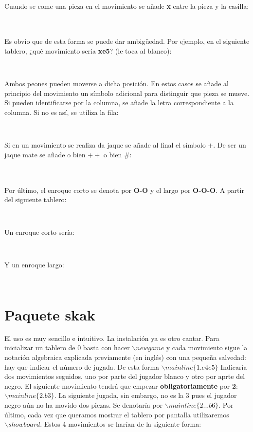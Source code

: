 \documentclass{article}
\begin{document}
 \\
\showboard

Cuando se come una pieza en el movimiento se añade \textbf{x} entre la pieza y la casilla:

 \\
\showboard \\

Es obvio que de esta forma se puede dar ambigüedad. Por ejemplo, en el siguiente tablero, ¿qué movimiento sería \textbf{xe5}? (le toca al blanco):

\newgame
{} \\
\showboard

Ambos peones pueden moverse a dicha posición. En estos casos se añade al principio del movimiento un símbolo adicional para distinguir que pieza se mueve. Si pueden identificarse por la columna, se añade la letra correspondiente a la columna. Si no es así, se utiliza la fila:

 \\
\showboard

Si en un movimiento se realiza da jaque se añade al final el símbolo $+$. De ser un jaque mate se añade o bien $++$ o bien $\#$:

 \\
\showboard \\

Por último, el enroque corto se denota por \textbf{O-O} y el largo por \textbf{O-O-O}. A partir del siguiente tablero:

\newgame
{} \\
\showboard

Un enroque corto sería:

 \\
\showboard

Y un enroque largo:

 \\
\showboard

\section{Paquete skak}

El uso es muy sencillo e intuitivo. La instalación ya es otro cantar. Para inicializar un tablero de 0 basta con hacer $\backslash newgame$ y cada movimiento sigue la notación algebraica explicada previamente (en inglés) con una pequeña salvedad: hay que indicar el número de jugada. De esta forma $\backslash mainline\{1.e4 e5\}$ Indicaría dos movimientos seguidos, uno por parte del jugador blanco y otro por aprte del negro. El siguiente movimiento tendrá que empezar \textbf{obligatoriamente} por \textbf{2}: $\backslash mainline\{2.b3\}$. La siguiente jugada, sin embargo, no es la 3 pues el jugador negro aún no ha movido dos piezas. Se denotaría por $\backslash mainline\{2...b6\}$. Por último, cada vez que queramos mostrar el tablero por pantalla utilizaremos $\backslash showboard$. Estos 4 movimientos se harían de la siguiente forma:
\end{document}
